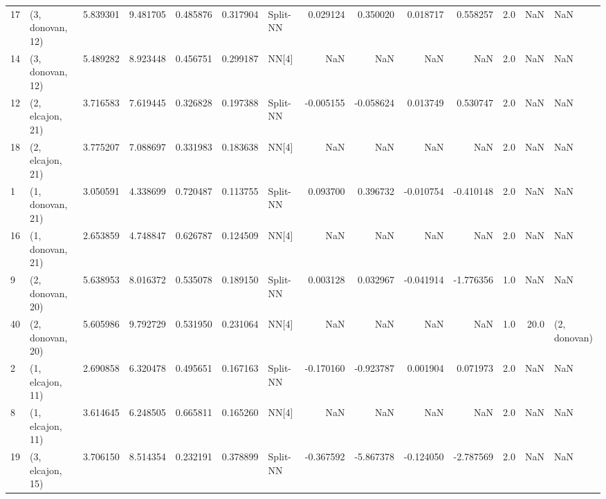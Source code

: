 \begin{tabular}{llrrrrlrrrrrrl}
17 &  (3, donovan, 12) &   5.839301 &   9.481705 &   0.485876 &  0.317904 &    Split-NN &        0.029124 &      0.350020 &       0.018717 &     0.558257 &            2.0 &    NaN &              NaN \\
14 &  (3, donovan, 12) &   5.489282 &   8.923448 &   0.456751 &  0.299187 &       NN[4] &             NaN &           NaN &            NaN &          NaN &            2.0 &    NaN &              NaN \\
12 &  (2, elcajon, 21) &   3.716583 &   7.619445 &   0.326828 &  0.197388 &    Split-NN &       -0.005155 &     -0.058624 &       0.013749 &     0.530747 &            2.0 &    NaN &              NaN \\
18 &  (2, elcajon, 21) &   3.775207 &   7.088697 &   0.331983 &  0.183638 &       NN[4] &             NaN &           NaN &            NaN &          NaN &            2.0 &    NaN &              NaN \\
1  &  (1, donovan, 21) &   3.050591 &   4.338699 &   0.720487 &  0.113755 &    Split-NN &        0.093700 &      0.396732 &      -0.010754 &    -0.410148 &            2.0 &    NaN &              NaN \\
16 &  (1, donovan, 21) &   2.653859 &   4.748847 &   0.626787 &  0.124509 &       NN[4] &             NaN &           NaN &            NaN &          NaN &            2.0 &    NaN &              NaN \\
9  &  (2, donovan, 20) &   5.638953 &   8.016372 &   0.535078 &  0.189150 &    Split-NN &        0.003128 &      0.032967 &      -0.041914 &    -1.776356 &            1.0 &    NaN &              NaN \\
40 &  (2, donovan, 20) &   5.605986 &   9.792729 &   0.531950 &  0.231064 &       NN[4] &             NaN &           NaN &            NaN &          NaN &            1.0 &   20.0 &     (2, donovan) \\
2  &  (1, elcajon, 11) &   2.690858 &   6.320478 &   0.495651 &  0.167163 &    Split-NN &       -0.170160 &     -0.923787 &       0.001904 &     0.071973 &            2.0 &    NaN &              NaN \\
8  &  (1, elcajon, 11) &   3.614645 &   6.248505 &   0.665811 &  0.165260 &       NN[4] &             NaN &           NaN &            NaN &          NaN &            2.0 &    NaN &              NaN \\
19 &  (3, elcajon, 15) &   3.706150 &   8.514354 &   0.232191 &  0.378899 &    Split-NN &       -0.367592 &     -5.867378 &      -0.124050 &    -2.787569 &            2.0 &    NaN &              NaN \\

\end{tabular}
